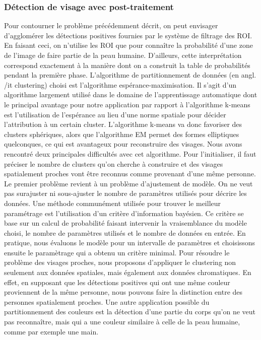 \documentclass[a4paper,11pt]{article}
\begin{document}
\subsubsection{Détection de visage avec post-traitement}
Pour contourner le problème précédemment décrit, on peut envisager d'agglomérer les détections positives fournies par le système de filtrage des ROI.
En faisant ceci, on n'utilise les ROI que pour connaître la probabilité d'une zone de l'image de faire partie de la peau humaine.
D'ailleurs, cette interprétation correspond exactement à la manière dont on a construit la table de probabilités pendant la première phase.
\newline
\newline
L'algorithme de partitionnement de données (en angl. {/it clustering}) choisi est l'algorithme espérance-maximisation.
Il s'agit d'un algorithme largement utilisé dans le domaine de l'apprentissage automatique dont le principal avantage pour notre application par rapport à l'algorithme k-means est l'utilisation de l'espérance au lieu d'une norme spatiale pour décider l'attribution à un certain cluster.
L'algorithme k-means va donc favoriser des clusters sphériques, alors que l'algorithme EM permet des formes elliptiques quelconques, ce qui est avantageux pour reconstruire des visages.
\newline
Nous avons rencontré deux principales difficultés avec cet algorithme. 
Pour l'initialiser, il faut préciser le nombre de clusters qu'on cherche à construire et des visages spatialement proches vont être reconnus comme provenant d'une même personne.
Le premier problème revient à un problème d'ajustement de modèle. On ne veut pas surajuster ni sous-ajuster le nombre de paramètres utilisés pour décrire les données.
Une méthode communément utilisée pour trouver le meilleur paramétrage est l'utilisation d'un critère d'information bayésien.
Ce critère se base sur un calcul de probabilité faisant intervenir la vraisemblance du modèle choisi, le nombre de paramètres utilisés et le nombre de données en entrée.
En pratique, nous évaluons le modèle pour un intervalle de paramètres et choisissons ensuite le paramètrage qui a obtenu un critère minimal.
\newline
\newline
Pour résoudre le problème des visages proches, nous proposons d'appliquer le clustering non seulement aux données spatiales, mais également aux données chromatiques.
En effet, en supposant que les détections positives qui ont une même couleur proviennent de la même personne, nous pouvons faire la distinction entre des personnes spatialement proches.
\newline
\newline
Une autre application possible du partitionnement des couleurs est la détection d'une partie du corps qu'on ne veut pas reconnaître, mais qui a une couleur similaire à celle de la peau humaine, comme par exemple une main.
\end{document}
